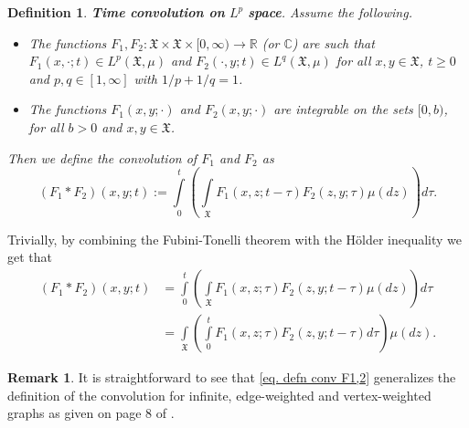 \documentclass[11pt,reqno]{amsart}
\newtheorem{definition}[theorem]{Definition}
\theoremstyle{remark}
\theoremstyle{definition}
\newtheorem{remark}{Remark}
\numberwithin{theorem}{section} \numberwithin{equation}{section}
\newcommand{\X}{\mathfrak{X}}
\def\lp{\left(}
\def\rp{\right)}
\begin{document}
\begin{definition} \textbf{Time convolution on} $L^p$ \textbf{space}. \label{def. conv}
Assume the following.
\begin{itemize}
\item The functions $F_1,F_2: \X\times\X\times[0,\infty)\to \mathbb{R}$ (or $\mathbb{C}$) are such
that $F_1(x,\cdot;t)\in L^p(\X,\mu)$ and $F_2(\cdot,y;t)\in L^q(\X,\mu)$ for all $x,y\in\X$, $t\geq 0$ and $p,q\in[1,\infty]$ with $1/p+1/q=1$.
\item The functions $F_1(x,y;\cdot)$ and $F_2(x,y;\cdot)$ are integrable on the sets $[0, b)$, for all $b>0$ and $x,y\in\X$.
\end{itemize}
\noindent
Then we define the convolution of $F_1$ and $F_2$ as
\begin{equation}\label{eq. defn conv F1,2}
(F_1\ast F_2)(x,y;t):=\int\limits_{0}^t\lp\int\limits_{\X}F_1(x,z;t-\tau)F_2(z,y;\tau)\mu(dz)\rp d\tau.
\end{equation}
\end{definition}

Trivially, by combining the Fubini-Tonelli theorem with the H\"older inequality we get that
\begin{align*}
(F_1\ast F_2)(x,y;t)&=\int\limits_{0}^t\lp\int\limits_{\X}F_1(x,z;\tau)F_2(z,y;t-\tau)\mu(dz)\rp d\tau
\\&= \int\limits_{\X}\lp\int\limits_{0}^t F_1(x,z;\tau)F_2(z,y;t-\tau) d\tau\rp \mu(dz).
\end{align*}

\begin{remark}
It is straightforward to see that \eqref{eq. defn conv F1,2} generalizes the definition of the convolution for
infinite, edge-weighted and vertex-weighted graphs as given on page 8 of \cite{JKS26}.
\end{remark}

\end{document}
